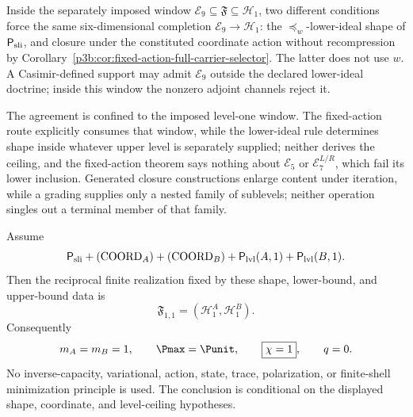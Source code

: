 \documentclass[11pt,a4paper]{article}
\begin{document}
\begin{remark}
\label{p3:rem:level-one-window-agreement}
Inside the separately imposed window
\(\mathcal E_9\subseteq\mathfrak F\subseteq\mathcal H_1\), two different
conditions force the same six-dimensional completion
\(\mathcal E_9\to\mathcal H_1\): the \(\preceq_w\)-lower-ideal shape of
\(\mathsf P_{\rm sli}\), and closure under the constituted coordinate action
without recompression by
Corollary~\ref{p3b:cor:fixed-action-full-carrier-selector}.  The latter does
not use \(w\).  A Casimir-defined support may admit \(\mathcal E_9\) outside
the declared lower-ideal doctrine; inside this window the nonzero adjoint
channels reject it.

The agreement is confined to the imposed level-one window.  The fixed-action
route explicitly consumes that window, while the lower-ideal rule determines
shape inside whatever upper level is separately supplied; neither derives the
ceiling, and the fixed-action theorem says nothing about
\(\mathcal E_5\) or \(\mathcal E_7^{L/R}\), which fail its lower inclusion.
Generated closure constructions enlarge content under iteration, while a
grading supplies only a nested family of sublevels; neither operation singles
out a terminal member of that family.
\end{remark}

\begin{theorem}
\label{p3b:thm:legacy-finite-role-realization}
Assume
\[
 \mathsf P_{\rm sli}
 +(\mathrm{COORD}_A)+(\mathrm{COORD}_B)
 +\mathsf P_{\rm lvl}(A,1)+\mathsf P_{\rm lvl}(B,1).
\]
Then the reciprocal finite realization fixed by these shape, lower-bound, and
upper-bound data is
\[
 \boxed{\mathfrak F_{1,1}=(\mathcal H_1^A,\mathcal H_1^B)}.
\]
Consequently
\[
 m_A=m_B=1,
 \qquad
 \Pmax=\Punit,
 \qquad
 \boxed{\chi=1},
 \qquad
 q=0.
\]
No inverse-capacity, variational, action, state, trace, polarization, or
finite-shell minimization principle is used.  The conclusion is conditional on
the displayed shape, coordinate, and level-ceiling hypotheses.
\end{theorem}
\end{document}
